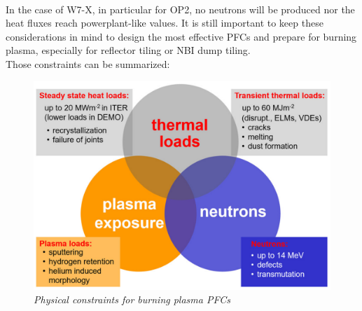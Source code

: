 \\
\break
\normalsize{\indent In the case of \acrshort{W7-X}, in particular for \acrshort{OP2}, no neutrons will be produced nor the heat fluxes reach powerplant-like values. It is still important to keep these considerations in mind to design the most effective \acrshort{PFCs} and prepare for burning plasma, especially for reflector tiling or \acrshort{NBI} dump tiling. }
\\
\break
\normalsize{\indent Those constraints can be summarized:}
\begin{figure}[h!]
    \centering
    \includegraphics[width=.7\textwidth]{figures/physicalconstraintsBurningPLasma.png}
    \caption{\it Physical constraints for burning plasma \acrshort{PFCs} \cites{Linke_2019}}
    \label{fig:fig_3_3}
\end{figure}
\\

